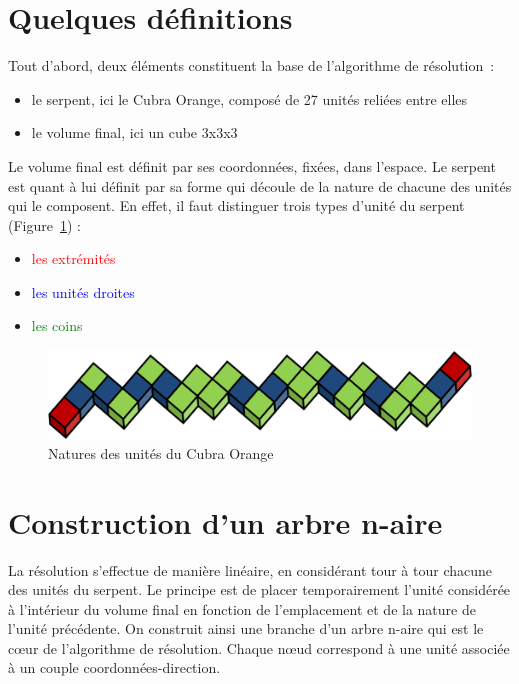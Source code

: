 \section{Quelques définitions}

Tout d’abord, deux éléments constituent la base de l’algorithme de résolution :\newline

\begin{itemize}
 \item le serpent, ici le Cubra Orange, composé de 27 unités reliées entre elles
 \item le volume final, ici un cube 3x3x3
\end{itemize}

\vspace{0.5cm}

Le volume final est définit par ses coordonnées, fixées, dans l’espace. Le serpent est quant à lui définit par sa forme qui découle de la nature de chacune des unités qui le composent. En effet, il faut distinguer trois types d’unité du serpent (Figure~\ref{snakeUnits}) :\newline

\begin{itemize}
 \item \textcolor{red}{les extrémités}
 \item \textcolor{blue}{les unités droites}
 \item \textcolor{green}{les coins}
\end{itemize}

\begin{figure}[h]
 \centering
 \includegraphics[scale=0.5,keepaspectratio=true]{img/unitTypes.png}
 \caption{Natures des unités du Cubra Orange}
 \label{snakeUnits}
\end{figure}

\clearpage
\section{Construction d’un arbre n-aire}
La résolution s’effectue de manière linéaire, en considérant tour à tour chacune des unités du serpent. Le principe est de placer temporairement l’unité considérée à l’intérieur du volume final en fonction de l’emplacement et de la nature de l’unité précédente. On construit ainsi une branche d’un arbre n-aire qui est le cœur de l’algorithme de résolution. Chaque nœud correspond à une unité associée à un couple coordonnées-direction.

